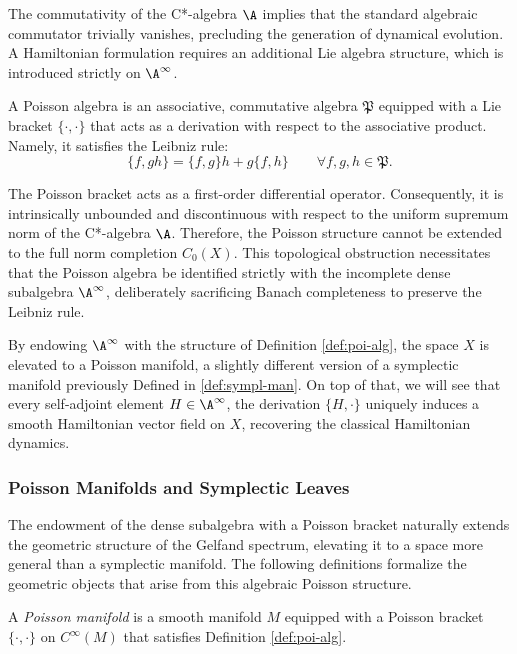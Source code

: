 The commutativity of the C*-algebra \(\A\) implies that the standard algebraic commutator trivially vanishes, precluding the generation of dynamical evolution. A Hamiltonian formulation requires an additional Lie algebra structure, which is introduced strictly on \(\A^\infty\).

\begin{definition}\label{def:poi-alg}
	A Poisson algebra is an associative, commutative algebra \(\mathfrak{P}\) equipped with a Lie bracket \(\{\cdot,\cdot\}\) that acts as a derivation with respect to the associative product. Namely, it satisfies the Leibniz rule:
	\[
	\{f, gh\} = \{f, g\}h + g\{f, h\} \qquad \forall f, g, h \in \mathfrak{P}.
	\]
\end{definition}

The Poisson bracket acts as a first-order differential operator. Consequently, it is intrinsically unbounded and discontinuous with respect to the uniform supremum norm of the C*-algebra \(\A\). Therefore, the Poisson structure cannot be extended to the full norm completion \(C_0(X)\). This topological obstruction necessitates that the Poisson algebra be identified strictly with the incomplete dense subalgebra \(\A^\infty\), deliberately sacrificing Banach completeness to preserve the Leibniz rule.

By endowing \(\A^\infty\) with the structure of Definition \ref{def:poi-alg}, the space \(X\) is elevated to a Poisson manifold, a slightly different version of a symplectic manifold previously Defined in \ref{def:sympl-man}. On top of that, we will see that every self-adjoint element \(H \in \A^\infty\), the derivation \(\{H,\cdot\}\) uniquely induces a smooth Hamiltonian vector field on \(X\), recovering the classical Hamiltonian dynamics.

\subsubsection*{Poisson Manifolds and Symplectic Leaves}

The endowment of the dense subalgebra with a Poisson bracket naturally extends the geometric structure of the Gelfand spectrum, elevating it to a space more general than a symplectic manifold. The following definitions formalize the geometric objects that arise from this algebraic Poisson structure.

\begin{definition}\label{def:poisson-manifold}
	A \emph{Poisson manifold} is a smooth manifold \(M\) equipped with a Poisson bracket \(\{\cdot,\cdot\}\) on \(C^\infty(M)\) that satisfies Definition \ref{def:poi-alg}.
\end{definition}

